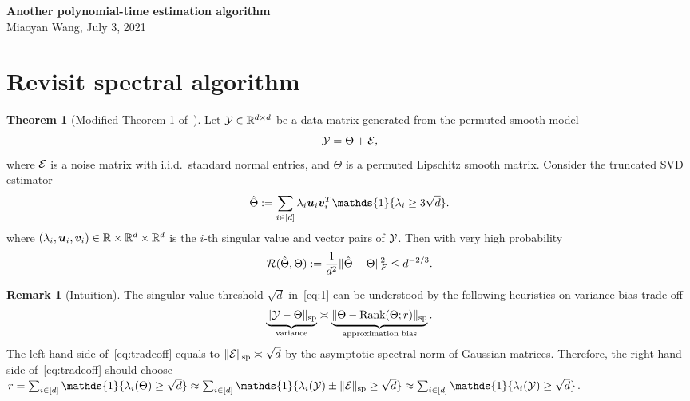 \documentclass[10pt]{article}
\newcommand*{\KeepStyleUnderBrace}[1]{%
  \mathop{%
    \mathchoice
    {\underbrace{\displaystyle#1}}%
    {\underbrace{\textstyle#1}}%
    {\underbrace{\scriptstyle#1}}%
    {\underbrace{\scriptscriptstyle#1}}%
  }\limits
}
\theoremstyle{definition}
\newtheorem{thm}{Theorem}[section]
\theoremstyle{definition}
\newtheorem{rmk}{Remark}
\def\rank{\text{Rank}}
\theoremstyle{definition}
\begin{document}
\begin{center}
{\bf \large Another polynomial-time estimation algorithm}\\
{Miaoyan Wang, July 3, 2021}\\
\end{center}

\section{Revisit spectral algorithm}
\begin{thm}[Modified Theorem 1 of~\cite{xu2018rates}] Let $\mathcal{Y}\in\mathbb{R}^{d\times d}$ be a data matrix generated from the permuted smooth model
\[
\mathcal{Y}=\Theta+\mathcal{E},
\] 
where $\mathcal{E}$ is a noise matrix with i.i.d.\ standard normal entries, and $\Theta$ is a permuted Lipschitz smooth matrix. Consider the truncated SVD estimator
\begin{equation}\label{eq:1}
\hat \Theta := \sum_{i\in[d]}\lambda_i\bmu_i\mv^T_i\mathds{1}\{\lambda_i\geq3\sqrt{d}\}.
\end{equation}
where $(\lambda_i,\bm{u}_i, \bm{v}_i)\in\mathbb{R}\times\mathbb{R}^d\times\mathbb{R}^d$ is the $i$-th singular value and vector pairs of $\mathcal{Y}$. Then with very high probability
\[
\mathcal{R}(\hat \Theta, \Theta):={1\over d^2}\lVert\hat \Theta-\Theta\rVert_F^2\leq d^{-2/3}. 
\]
\end{thm}
\begin{rmk}[Intuition]
The singular-value threshold $\sqrt{d}$ in~\eqref{eq:1} can be understood by the following heuristics on variance-bias trade-off 
\begin{align}\label{eq:tradeoff}
\KeepStyleUnderBrace{\snormSize{}{\tY-\Theta}}_{\text{variance}}\asymp \KeepStyleUnderBrace{\snormSize{}{\Theta-\rank(\Theta; r)}}_{\text{approximation bias}}.
\end{align}
The left hand side of~\eqref{eq:tradeoff} equals to $\lVert\mathcal{E}\rVert_\text{sp}\asymp \sqrt{d}$ by the asymptotic spectral norm of Gaussian matrices. Therefore, the right hand side of~\eqref{eq:tradeoff} should choose $r=\sum_{i\in[d]}\mathds{1}\{\lambda_i(\Theta) \geq \sqrt{d}\} \approx \sum_{i\in[d]}\mathds{1}\{\lambda_i(\tY)\pm \snormSize{}{\tE} \geq \sqrt{d}\} \approx \sum_{i\in[d]}\mathds{1}\{\lambda_i(\tY) \geq \sqrt{d}\}$. 
\end{rmk}
\end{document}
